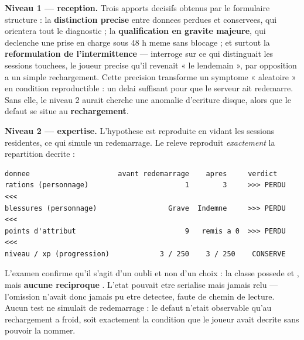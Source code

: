 \textbf{Niveau 1 --- reception.} Trois apports decisifs obtenus par le formulaire structure : la
\textbf{distinction precise} entre donnees perdues et conservees, qui orientera tout le diagnostic ;
la \textbf{qualification en gravite majeure}, qui declenche une prise en charge sous 48 h meme sans
blocage ; et surtout la \textbf{reformulation de l'intermittence} --- interroge sur ce qui
distinguait les sessions touchees, le joueur precise qu'il revenait « le lendemain », par
opposition a un simple rechargement. Cette precision transforme un symptome « aleatoire » en
condition reproductible : un delai suffisant pour que le serveur ait redemarre. Sans elle, le
niveau 2 aurait cherche une anomalie d'ecriture disque, alors que le defaut se situe au
\textbf{rechargement}.

\textbf{Niveau 2 --- expertise.} L'hypothese est reproduite en vidant les sessions residentes, ce
qui simule un redemarrage. Le releve reproduit \emph{exactement} la repartition decrite :

\begin{lstlisting}[style=sortie]
donnee                     avant redemarrage    apres     verdict
rations (personnage)                       1        3     >>> PERDU <<<
blessures (personnage)                 Grave  Indemne     >>> PERDU <<<
points d'attribut                          9   remis a 0  >>> PERDU <<<
niveau / xp (progression)            3 / 250    3 / 250    CONSERVE
\end{lstlisting}


L'examen confirme qu'il s'agit d'un oubli et non d'un choix : la classe possede  et
, mais \textbf{aucune reciproque }. L'etat pouvait etre serialise mais
jamais relu --- l'omission n'avait donc jamais pu etre detectee, faute de chemin de lecture. Aucun
test ne simulait de redemarrage : le defaut n'etait observable qu'au rechargement a froid, soit
exactement la condition que le joueur avait decrite sans pouvoir la nommer.

